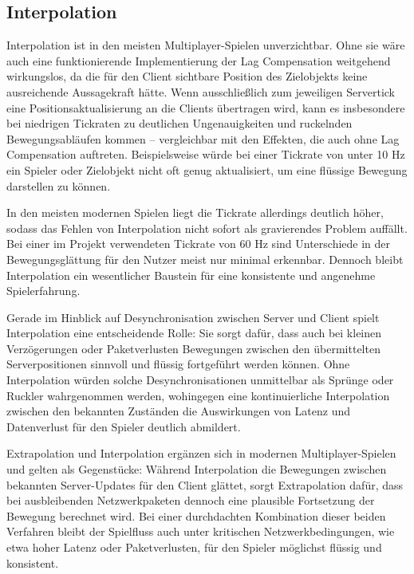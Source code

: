 \begin{enumerate}
\newpage

\section{Interpolation}
Interpolation ist in den meisten Multiplayer-Spielen unverzichtbar. Ohne sie wäre auch eine funktionierende Implementierung der Lag Compensation weitgehend wirkungslos, da die für den Client sichtbare Position des Zielobjekts keine ausreichende Aussagekraft hätte. Wenn ausschließlich zum jeweiligen Servertick eine Positionsaktualisierung an die Clients übertragen wird, kann es insbesondere bei niedrigen Tickraten zu deutlichen Ungenauigkeiten und ruckelnden Bewegungsabläufen kommen – vergleichbar mit den Effekten, die auch ohne Lag Compensation auftreten. Beispielsweise würde bei einer Tickrate von unter 10 Hz ein Spieler oder Zielobjekt nicht oft genug aktualisiert, um eine flüssige Bewegung darstellen zu können.

In den meisten modernen Spielen liegt die Tickrate allerdings deutlich höher, sodass das Fehlen von Interpolation nicht sofort als gravierendes Problem auffällt. Bei einer im Projekt verwendeten Tickrate von 60 Hz sind Unterschiede in der Bewegungsglättung für den Nutzer meist nur minimal erkennbar. Dennoch bleibt Interpolation ein wesentlicher Baustein für eine konsistente und angenehme Spielerfahrung.

Gerade im Hinblick auf Desynchronisation zwischen Server und Client spielt Interpolation eine entscheidende Rolle: Sie sorgt dafür, dass auch bei kleinen Verzögerungen oder Paketverlusten Bewegungen zwischen den übermittelten Serverpositionen sinnvoll und flüssig fortgeführt werden können. Ohne Interpolation würden solche Desynchronisationen unmittelbar als Sprünge oder Ruckler wahrgenommen werden, wohingegen eine kontinuierliche Interpolation zwischen den bekannten Zuständen die Auswirkungen von Latenz und Datenverlust für den Spieler deutlich abmildert.

Extrapolation und Interpolation ergänzen sich in modernen Multiplayer-Spielen und gelten als Gegenstücke: Während Interpolation die Bewegungen zwischen bekannten Server-Updates für den Client glättet, sorgt Extrapolation dafür, dass bei ausbleibenden Netzwerkpaketen dennoch eine plausible Fortsetzung der Bewegung berechnet wird. Bei einer durchdachten Kombination dieser beiden Verfahren bleibt der Spielfluss auch unter kritischen Netzwerkbedingungen, wie etwa hoher Latenz oder Paketverlusten, für den Spieler möglichst flüssig und konsistent.


\end{enumerate}
